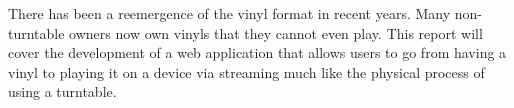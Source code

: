 %
{\singlespacing
There has been a reemergence of the vinyl format in recent years. Many non-turntable owners now own vinyls that they cannot even play. This report will cover the development of a web application that allows users to go from having a vinyl to playing it on a device via streaming much like the physical process of using a turntable.
}
